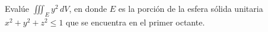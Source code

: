 \item Evalúe $\iiint_E y^2 \, dV$, en donde $E$ es la porción de la esfera sólida unitaria $x^2 + y^2 + z^2 \le 1$ que se encuentra en el primer octante.
